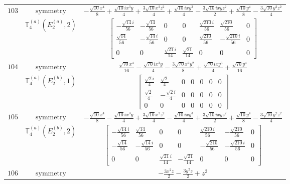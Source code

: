 \documentclass[fleqn,8pt,landscape]{jsarticle}
\begin{document}
\begin{longtable}{ccc}
$ 103 $ & $ \text{symmetry} $ & $ - \frac{\sqrt{10} x^{4}}{8} + \frac{\sqrt{10} i x^{3} y}{4} + \frac{3 \sqrt{10} x^{2} z^{2}}{4} + \frac{\sqrt{10} i x y^{3}}{4} - \frac{3 \sqrt{10} i x y z^{2}}{2} + \frac{\sqrt{10} y^{4}}{8} - \frac{3 \sqrt{10} y^{2} z^{2}}{4} $ \\
$  $ & $ \mathbb{T}_{4}^{(a)}(E_{2}^{(a)},2) $ & $ \begin{bmatrix} - \frac{\sqrt{14} i}{56} & - \frac{\sqrt{14}}{56} & 0 & 0 & \frac{\sqrt{210} i}{56} & \frac{\sqrt{210}}{56} & 0 \\ \frac{\sqrt{14}}{56} & - \frac{\sqrt{14} i}{56} & 0 & 0 & \frac{\sqrt{210}}{56} & - \frac{\sqrt{210} i}{56} & 0 \\ 0 & 0 & \frac{\sqrt{21} i}{14} & \frac{\sqrt{21}}{14} & 0 & 0 & 0 \end{bmatrix} $ \\ \hline
$ 104 $ & $ \text{symmetry} $ & $ \frac{\sqrt{70} x^{4}}{16} - \frac{\sqrt{70} i x^{3} y}{4} - \frac{3 \sqrt{70} x^{2} y^{2}}{8} + \frac{\sqrt{70} i x y^{3}}{4} + \frac{\sqrt{70} y^{4}}{16} $ \\
$  $ & $ \mathbb{T}_{4}^{(a)}(E_{2}^{(b)},1) $ & $ \begin{bmatrix} \frac{\sqrt{2} i}{4} & \frac{\sqrt{2}}{4} & 0 & 0 & 0 & 0 & 0 \\ \frac{\sqrt{2}}{4} & - \frac{\sqrt{2} i}{4} & 0 & 0 & 0 & 0 & 0 \\ 0 & 0 & 0 & 0 & 0 & 0 & 0 \end{bmatrix} $ \\ \hline
$ 105 $ & $ \text{symmetry} $ & $ - \frac{\sqrt{10} x^{4}}{8} - \frac{\sqrt{10} i x^{3} y}{4} + \frac{3 \sqrt{10} x^{2} z^{2}}{4} - \frac{\sqrt{10} i x y^{3}}{4} + \frac{3 \sqrt{10} i x y z^{2}}{2} + \frac{\sqrt{10} y^{4}}{8} - \frac{3 \sqrt{10} y^{2} z^{2}}{4} $ \\
$  $ & $ \mathbb{T}_{4}^{(a)}(E_{2}^{(b)},2) $ & $ \begin{bmatrix} - \frac{\sqrt{14} i}{56} & \frac{\sqrt{14}}{56} & 0 & 0 & \frac{\sqrt{210} i}{56} & - \frac{\sqrt{210}}{56} & 0 \\ - \frac{\sqrt{14}}{56} & - \frac{\sqrt{14} i}{56} & 0 & 0 & - \frac{\sqrt{210}}{56} & - \frac{\sqrt{210} i}{56} & 0 \\ 0 & 0 & \frac{\sqrt{21} i}{14} & - \frac{\sqrt{21}}{14} & 0 & 0 & 0 \end{bmatrix} $ \\ \hline
$ 106 $ & $ \text{symmetry} $ & $ - \frac{3 x^{2} z}{2} - \frac{3 y^{2} z}{2} + z^{3} $ \\

\end{longtable}
\end{document}
